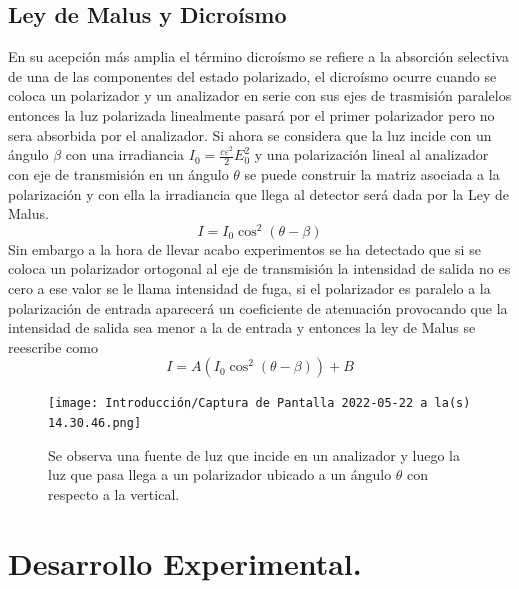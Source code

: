 \documentclass[DIV=calc, paper=a4, fontsize=10pt]{scrartcl}
\begin{document}
\subsection*{\textcolor{carmine}{Ley de Malus y Dicroísmo}}
En su acepción más amplia el término dicroísmo se refiere a la
absorción selectiva de una de las componentes del estado polarizado, el dicroísmo ocurre cuando se coloca un polarizador y un analizador en serie con sus ejes de trasmisión paralelos entonces la luz polarizada linealmente pasará por el primer polarizador pero no sera absorbida por el analizador\cite{book}. Si ahora se considera que la luz incide con un ángulo $\beta$  con una irradiancia $I_{0}=\frac{c\varepsilon^{2}}{2}E_{0}^{2}$ y una polarización lineal al analizador con eje de transmisión en un ángulo $\theta$
se puede construir la matriz asociada a la polarización y con ella la irradiancia que llega al detector será dada por la Ley de Malus\cite{Manual}.
\begin{equation}
    I=I_{0}\cos^{2}(\theta-\beta)
\end{equation}
Sin embargo a la hora de llevar acabo experimentos se ha detectado que si se coloca un polarizador ortogonal al eje de transmisión la intensidad de salida no es cero a ese valor se le llama intensidad de fuga, si el polarizador es paralelo a la polarización de entrada aparecerá un coeficiente de atenuación provocando que la intensidad de salida sea menor a la de entrada y entonces la ley de Malus se reescribe como
\begin{equation}
    I=A(I_{0}\cos^{2}(\theta-\beta))+B
\end{equation}
\begin{figure}[H]
    \centering
    \texttt{[image: Introducción/Captura de Pantalla 2022-05-22 a la(s) 14.30.46.png]}
    \caption{Se observa una fuente de luz que incide en un analizador y luego la luz que pasa llega a un polarizador ubicado a un ángulo $\theta$ con respecto a la vertical\cite{book}.}
    \label{fig:my_label}
\end{figure}
\section*{\textcolor{carmine}{Desarrollo Experimental.}}
\end{document}
